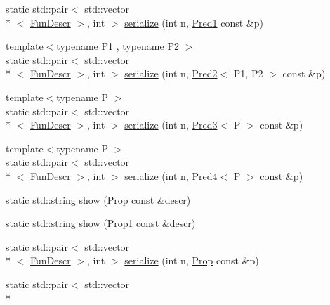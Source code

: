 \begin{DoxyCompactItemize}
\item 
static std\+::pair$<$ std\+::vector\\*
$<$ \hyperlink{structpfq__lang_1_1FunDescr}{Fun\+Descr} $>$, int $>$ \hyperlink{namespacepfq__lang_1_1term_aa703deb6d0471f1cda2bd309efb365c2}{serialize} (int n, \hyperlink{structpfq__lang_1_1term_1_1Pred1}{Pred1} const \&p)
\item 
{\footnotesize template$<$typename P1 , typename P2 $>$ }\\static std\+::pair$<$ std\+::vector\\*
$<$ \hyperlink{structpfq__lang_1_1FunDescr}{Fun\+Descr} $>$, int $>$ \hyperlink{namespacepfq__lang_1_1term_aaf3db3c975c62725003d581938f6e64a}{serialize} (int n, \hyperlink{structpfq__lang_1_1term_1_1Pred2}{Pred2}$<$ P1, P2 $>$ const \&p)
\item 
{\footnotesize template$<$typename P $>$ }\\static std\+::pair$<$ std\+::vector\\*
$<$ \hyperlink{structpfq__lang_1_1FunDescr}{Fun\+Descr} $>$, int $>$ \hyperlink{namespacepfq__lang_1_1term_a26dba32cd30fad7f83a4f9465810efd8}{serialize} (int n, \hyperlink{structpfq__lang_1_1term_1_1Pred3}{Pred3}$<$ P $>$ const \&p)
\item 
{\footnotesize template$<$typename P $>$ }\\static std\+::pair$<$ std\+::vector\\*
$<$ \hyperlink{structpfq__lang_1_1FunDescr}{Fun\+Descr} $>$, int $>$ \hyperlink{namespacepfq__lang_1_1term_a5b52555849e2427abd36e4b9d8db801b}{serialize} (int n, \hyperlink{structpfq__lang_1_1term_1_1Pred4}{Pred4}$<$ P $>$ const \&p)
\item 
static std\+::string \hyperlink{namespacepfq__lang_1_1term_a1472dcec0cb7179ecef930ad1af58abd}{show} (\hyperlink{structpfq__lang_1_1term_1_1Prop}{Prop} const \&descr)
\item 
static std\+::string \hyperlink{namespacepfq__lang_1_1term_afe3683cc62dc9cc9b7c3212f8dd29629}{show} (\hyperlink{structpfq__lang_1_1term_1_1Prop1}{Prop1} const \&descr)
\item 
static std\+::pair$<$ std\+::vector\\*
$<$ \hyperlink{structpfq__lang_1_1FunDescr}{Fun\+Descr} $>$, int $>$ \hyperlink{namespacepfq__lang_1_1term_adcc56fe8e5962c2f8993255030fdf03f}{serialize} (int n, \hyperlink{structpfq__lang_1_1term_1_1Prop}{Prop} const \&p)
\item 
static std\+::pair$<$ std\+::vector\\*

\end{DoxyCompactItemize}
